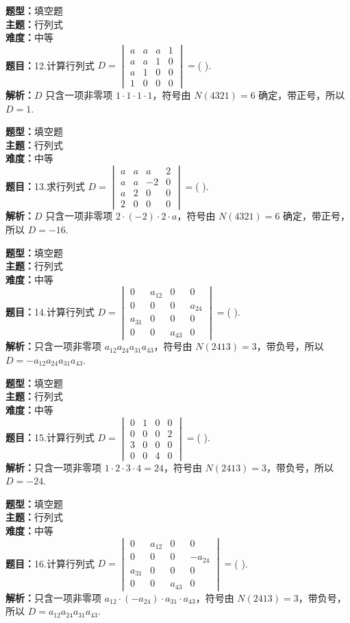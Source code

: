 \documentclass{ctexart}
\newenvironment{question}[5]{%
	\noindent\textbf{题型：}#1\\
	\textbf{主题：}#2\\
	\textbf{难度：}#3\\
	\textbf{题目：}#4\\
	\textbf{解析：}#5\\
	\vspace{1em}
}{}
\begin{document}
	\begin{question}
		{填空题}
		{行列式}
		{中等}
		{12.计算行列式 $D=\begin{vmatrix}a & a & a & 1 \\ a & a & 1 & 0 \\ a & 1 & 0 & 0 \\ 1 & 0 & 0 & 0\end{vmatrix}=$(  ).}
		{$D$ 只含一项非零项 $1 \cdot 1 \cdot 1 \cdot 1$，符号由 $N(4321)=6$ 确定，带正号，所以 $D=1$.}
	\end{question}
	
	\begin{question}
		{填空题}
		{行列式}
		{中等}
		{13.求行列式 $D=\begin{vmatrix}a & a & a & 2 \\ a & a & -2 & 0 \\ a & 2 & 0 & 0 \\ 2 & 0 & 0 & 0\end{vmatrix}=$(  ).}
		{$D$ 只含一项非零项 $2 \cdot (-2) \cdot 2 \cdot a$，符号由 $N(4321)=6$ 确定，带正号，所以 $D=-16$.}
	\end{question}
	
	\begin{question}
		{填空题}
		{行列式}
		{中等}
		{14.计算行列式 $D=\begin{vmatrix}0 & a_{12} & 0 & 0 \\ 0 & 0 & 0 & a_{24} \\ a_{31} & 0 & 0 & 0 \\ 0 & 0 & a_{43} & 0\end{vmatrix}=$(  ).}
		{只含一项非零项 $a_{12} a_{24} a_{31} a_{43}$，符号由 $N(2413)=3$，带负号，所以 $D=-a_{12} a_{24} a_{31} a_{43}$.}
	\end{question}
	
	\begin{question}
		{填空题}
		{行列式}
		{中等}
		{15.计算行列式 $D=\begin{vmatrix}0 & 1 & 0 & 0 \\ 0 & 0 & 0 & 2 \\ 3 & 0 & 0 & 0 \\ 0 & 0 & 4 & 0\end{vmatrix}=$(  ).}
		{只含一项非零项 $1 \cdot 2 \cdot 3 \cdot 4=24$，符号由 $N(2413)=3$，带负号，所以 $D=-24$.}
	\end{question}
	
	\begin{question}
		{填空题}
		{行列式}
		{中等}
		{16.计算行列式 $D=\begin{vmatrix}0 & a_{12} & 0 & 0 \\ 0 & 0 & 0 & -a_{24} \\ a_{31} & 0 & 0 & 0 \\ 0 & 0 & a_{43} & 0\end{vmatrix}=$(  ).}
		{只含一项非零项 $a_{12} \cdot (-a_{24}) \cdot a_{31} \cdot a_{43}$，符号由 $N(2413)=3$，带负号，所以 $D=a_{12} a_{24} a_{31} a_{43}$.}
	\end{question}
	
\end{document}
